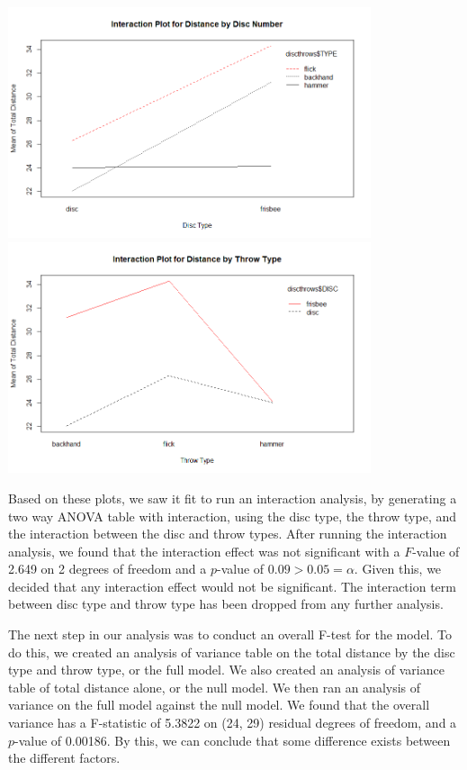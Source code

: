 \documentclass[letter,12pt]{article}
\begin{document}
  \begin{center}
    \includegraphics[width=0.8\textwidth]{intdistdisc.png}
    \includegraphics[width=0.8\textwidth]{interactiondistthrow.png}
  \end{center}
  Based on these plots, we saw it fit to run an interaction analysis, by generating a two way ANOVA table with interaction, using the disc type, the throw type, and the interaction between the disc and throw types. After running the interaction analysis, we found that the interaction effect was not significant with a $F$-value of 2.649 on 2 degrees of freedom and a $p$-value of $0.09 > 0.05 = \alpha$. Given this, we decided that any interaction effect would not be significant. The interaction term between disc type and throw type has been dropped from any further analysis.\par
  The next step in our analysis was to conduct an overall F-test for the model. To do this, we created an analysis of variance table on the total distance by the disc type and throw type, or the full model. We also created an analysis of variance table of total distance alone, or the null model. We then ran an analysis of variance on the full model against the null model. We found that the overall variance has a F-statistic of 5.3822 on (24, 29) residual degrees of freedom, and a $p$-value of 0.00186. By this, we can conclude that some difference exists between the different factors.\par
\end{document}
